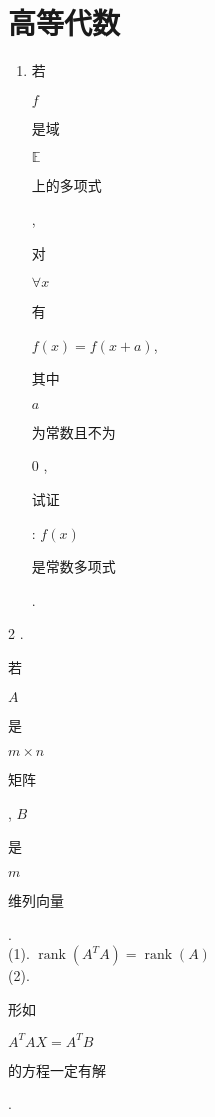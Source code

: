 \documentclass[10pt]{article}
\begin{document}
\section{高等代数}
\begin{enumerate}
  \item \begin{CJK}{UTF8}{mj}若\end{CJK} $f$ \begin{CJK}{UTF8}{mj}是域\end{CJK} $\mathbb{E}$ \begin{CJK}{UTF8}{mj}上的多项式\end{CJK}, \begin{CJK}{UTF8}{mj}对\end{CJK} $\forall x$ \begin{CJK}{UTF8}{mj}有\end{CJK} $f(x)=f(x+a)$, \begin{CJK}{UTF8}{mj}其中\end{CJK} $a$ \begin{CJK}{UTF8}{mj}为常数且不为\end{CJK} 0 , \begin{CJK}{UTF8}{mj}试证\end{CJK}: $f(x)$ \begin{CJK}{UTF8}{mj}是常数多项式\end{CJK}.
\end{enumerate}
2 . \begin{CJK}{UTF8}{mj}若\end{CJK} $A$ \begin{CJK}{UTF8}{mj}是\end{CJK} $m \times n$ \begin{CJK}{UTF8}{mj}矩阵\end{CJK}, $B$ \begin{CJK}{UTF8}{mj}是\end{CJK} $m$ \begin{CJK}{UTF8}{mj}维列向量\end{CJK}.\\
(1). $\operatorname{rank}\left(A^{T} A\right)=\operatorname{rank}(A)$\\
(2). \begin{CJK}{UTF8}{mj}形如\end{CJK} $A^{T} A X=A^{T} B$ \begin{CJK}{UTF8}{mj}的方程一定有解\end{CJK}.
\end{document}
